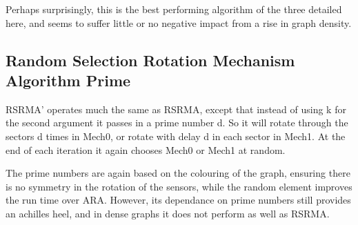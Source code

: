 Perhaps surprisingly, this is the best performing algorithm of the three detailed here, and seems to suffer little or no negative impact from a rise in graph density. 

\subsection{Random Selection Rotation Mechanism Algorithm Prime}
RSRMA' operates much the same as RSRMA, except that instead of using k for the second argument it passes in a prime number d. So it will rotate through the sectors d times in Mech0, or rotate with delay d in each sector in Mech1. At the end of each iteration it again chooses Mech0 or Mech1 at random.

The prime numbers are again based on the colouring of the graph, ensuring there is no symmetry in the rotation of the sensors, while the random element improves the run time over ARA. However, its dependance on prime numbers still provides an achilles heel, and in dense graphs it does not perform as well as RSRMA.


